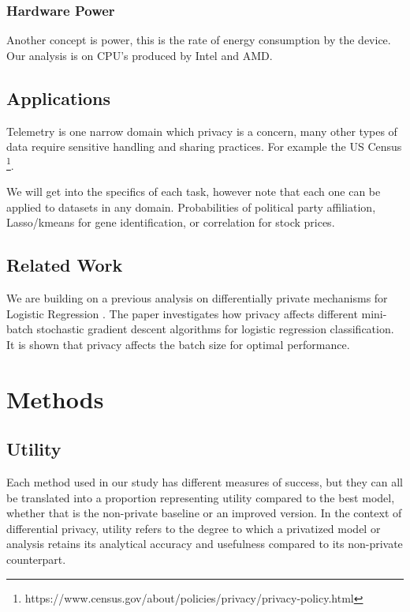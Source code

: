 \documentclass[12pt,letterpaper]{article}
\begin{document}
\subsubsection{Hardware Power}

Another concept is power, this is the rate of energy consumption by the device. Our analysis is on CPU's produced by Intel and AMD. \cite{Kwasnick2023}

\subsection{Applications}

Telemetry is one narrow domain which privacy is a concern, many other types of data require sensitive handling and sharing practices. For example the US Census \footnote{https://www.census.gov/about/policies/privacy/privacy-policy.html}. 

We will get into the specifics of each task, however note that each one can be applied to datasets in any domain. Probabilities of political party affiliation, Lasso/kmeans for gene identification, or correlation for stock prices. 

\subsection{Related Work}

We are building on a previous analysis on differentially private mechanisms for Logistic Regression  \cite{qtr1proj}. The paper investigates how privacy affects different mini-batch stochastic gradient descent algorithms for logistic regression classification. It is shown that privacy affects the batch size for optimal performance.


\section{Methods}

\subsection{Utility}

Each method used in our study has different measures of success, but they can all be translated into a proportion representing utility compared to the best model, whether that is the non-private baseline or an improved version. In the context of differential privacy, utility refers to the degree to which a privatized model or analysis retains its analytical accuracy and usefulness compared to its non-private counterpart.
\end{document}
